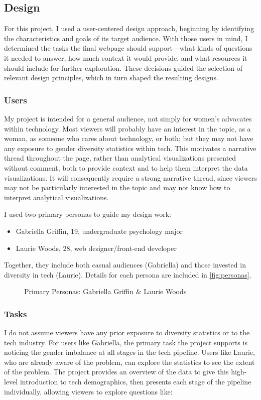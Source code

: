\subsection{Design}\label{sec:design}
For this project, I used a user-centered design approach, beginning by identifying the characteristics and goals of its target audience. With those users in mind, I determined the tasks the final webpage should support---what kinds of questions it needed to answer, how much context it would provide, and what resources it should include for further exploration. These decisions guided the selection of relevant design principles, which in turn shaped the resulting designs.

\subsubsection{Users}\label{users}
My project is intended for a general audience, not simply for women's advocates within technology. Most viewers will probably have an interest in the topic, as a woman, as someone who cares about technology, or both; but they may not have any exposure to gender diversity statistics within tech. This motivates a narrative thread throughout the page, rather than analytical visualizations presented without comment, both to provide context and to help them interpret the data visualizations. It will consequently require a strong narrative thread, since viewers may not be particularly interested in the topic and may not know how to interpret analytical visualizations.

I used two primary personas to guide my design work:
\begin{itemize}
  \item Gabriella Griffin, 19, undergraduate psychology major
  \item Laurie Woods, 28, web designer/front-end developer
\end{itemize}
Together, they include both casual audiences (Gabriella) and those invested in diversity in tech (Laurie). Details for each persona are included in \autoref{fig:personas}.

\begin{figure}
  \caption{Primary Personas: Gabriella Griffin \& Laurie Woods}\label{fig:personas}
\end{figure}

\subsubsection{Tasks}\label{tasks}
I do not assume viewers have any prior exposure to diversity statistics or to the tech industry. For users like Gabriella, the primary task the project supports is noticing the gender imbalance at all stages in the tech pipeline. Users like Laurie, who are already aware of the problem, can explore the statistics to see the extent of the problem. The project provides an overview of the data to give this high-level introduction to tech demographics, then presents each stage of the pipeline individually, allowing viewers to explore questions like:

